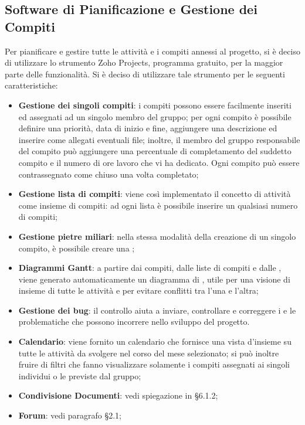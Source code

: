 \subsection{Software di Pianificazione e Gestione dei Compiti}
Per pianificare e gestire tutte le attività e i compiti annessi al progetto, si è deciso di utilizzare lo strumento Zoho Projects, programma gratuito, per la maggior parte delle funzionalità. Si è deciso di utilizzare tale strumento per le seguenti caratteristiche:
\begin{itemize}
\item \textbf{Gestione dei singoli compiti}: i compiti possono essere facilmente inseriti ed assegnati ad un singolo membro del gruppo; per ogni compito è possibile definire una priorità, data di inizio e fine, aggiungere una descrizione ed inserire come allegati eventuali file; inoltre, il membro del gruppo responsabile del compito può aggiungere una percentuale di completamento del suddetto compito e il numero di ore lavoro che vi ha dedicato. Ogni compito può essere contrassegnato come chiuso una volta completato;
\item \textbf{Gestione lista di compiti}: viene così implementato il concetto di attività come insieme di compiti: ad ogni lista è possibile inserire un qualsiasi numero di compiti;
\item \textbf{Gestione pietre miliari}: nella stessa modalità della creazione di un singolo compito, è possibile creare una ;
\item \textbf{Diagrammi Gantt}: a partire dai compiti, dalle liste di compiti e dalle , viene generato automaticamente un diagramma di , utile per una visione di insieme di tutte le attività e per evitare conflitti tra l'una e l'altra;
\item \textbf{Gestione dei bug}: il controllo  aiuta a inviare, controllare e correggere i  e le problematiche che possono incorrere nello sviluppo del progetto. 
\item \textbf{Calendario}: viene fornito un calendario che fornisce una vista d'insieme su tutte le attività da svolgere nel corso del mese selezionato; si può inoltre fruire di filtri che fanno visualizzare solamente i compiti assegnati ai singoli individui o le  previste dal gruppo;
\item \textbf{Condivisione Documenti}: vedi spiegazione in §6.1.2;
\item \textbf{Forum}: vedi paragrafo §2.1;
\end{itemize}


